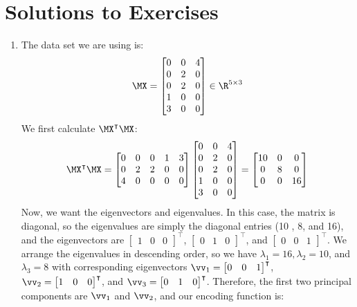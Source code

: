 \section{Solutions to Exercises}
\begin{enumerate}
    \item The data set we are using is:
    $$\MX = \begin{bmatrix} 0 & 0 & 4\\ 0 & 2 & 0\\ 0 & 2 & 0\\ 1 & 0 & 0\\ 3 & 0 & 0 \end{bmatrix} \in \R^{5 \times 3}$$
    We first calculate $\MX^\intercal\MX$:
    $$\MX^\intercal\MX = \begin{bmatrix} 0 & 0 & 0 & 1 & 3\\ 0 & 2 & 2 & 0 & 0\\ 4 & 0 & 0 & 0 & 0 \end{bmatrix} \begin{bmatrix} 0 & 0 & 4\\ 0 & 2 & 0\\ 0 & 2 & 0\\ 1 & 0 & 0\\ 3 & 0 & 0 \end{bmatrix} = \begin{bmatrix} 10 & 0 & 0\\ 0 & 8 & 0\\ 0 & 0 & 16 \end{bmatrix}$$
    Now, we want the eigenvectors and eigenvalues.  In this case, the matrix is diagonal, so the eigenvalues are simply the diagonal entries (10 , 8, and 16), and the eigenvectors are $\begin{bmatrix} 1 & 0 & 0 \end{bmatrix}^\intercal$, $\begin{bmatrix} 0 & 1 & 0 \end{bmatrix}^\intercal$, and $\begin{bmatrix} 0 & 0 & 1 \end{bmatrix}^\intercal$.  We arrange the eigenvalues in descending order, so we have $\lambda_1 = 16, \lambda_2 = 10$, and $\lambda_3 = 8$ with corresponding eigenvectors $\vv_1 = \begin{bmatrix} 0 & 0 & 1 \end{bmatrix}^\intercal$, $\vv_2 = \begin{bmatrix} 1 & 0 & 0 \end{bmatrix}^\intercal$, and $\vv_3 = \begin{bmatrix} 0 & 1 & 0 \end{bmatrix}^\intercal$.  Therefore, the first two principal components are $\vv_1$ and $\vv_2$, and our encoding function is:

\end{enumerate}

